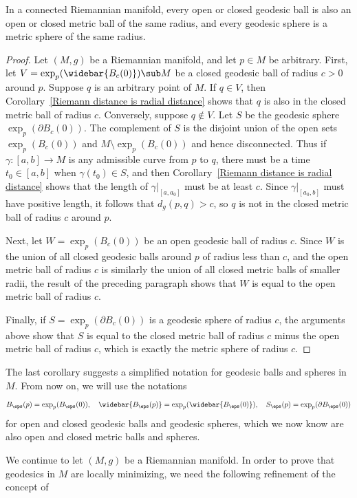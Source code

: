 \begin{corollary}\label{Riemann geodesic ball is metric ball}
In a connected Riemannian manifold, every open or closed geodesic ball is also an open or closed metric ball of the same radius, and every geodesic sphere is a metric sphere of the same radius.
\end{corollary}
\begin{proof}
Let $(M,g)$ be a Riemannian manifold, and let $p\in M$ be arbitrary. First, let $V=\exp_p(\widebar{B_c(0)})\sub M$ be a closed geodesic ball of radius $c>0$ around $p$. Suppose $q$ is an arbitrary point of $M$. If $q\in V$, then Corollary~\ref{Riemann distance is radial distance} shows that $q$ is also in the closed metric ball of radius $c$. Conversely, suppose $q\notin V$. Let $S$ be the geodesic sphere $\exp_p(\partial B_{c}(0))$. The complement of $S$ is the disjoint union of the open sets $\exp_p(B_{c}(0))$ and $M\setminus\exp_p(B_{c}(0))$ and hence disconnected. Thus if $\gamma:[a,b]\to M$ is any admissible curve from $p$ to $q$, there must be a time $t_0\in[a,b]$ when $\gamma(t_0)\in S$, and then Corollary~\ref{Riemann distance is radial distance} shows that the length of $\gamma|_{[a,a_0]}$ must be at least $c$. Since $\gamma|_{[a_0,b]}$ must have positive length, it follows that $d_g(p,q)>c$, so $q$ is not in the closed metric ball of radius $c$ around $p$.\par
Next, let $W=\exp_p(B_c(0))$ be an open geodesic ball of radius $c$. Since $W$ is the union of all closed geodesic balls around $p$ of radius less than $c$, and the open metric ball of radius $c$ is similarly the union of all closed metric balls of smaller radii, the result of the preceding paragraph shows that $W$ is equal 
to the open metric ball of radius $c$.\par
Finally, if $S=\exp_p(\partial B_c(0))$ is a geodesic sphere of radius $c$, the arguments above show that $S$ is equal to the closed metric ball of radius $c$ minus the open metric ball of radius $c$, which is exactly the metric sphere of radius $c$.
\end{proof}
The last corollary suggests a simplified notation for geodesic balls and spheres in $M$. From now on, we will use the notations
\[B_{\eps}(p)=\exp_p(B_{\eps}(0)),\quad\widebar{B_{\eps}(p)}=\exp_p(\widebar{B_{\eps}(0)}),\quad S_{\eps}(p)=\exp_p(\partial B_{\eps}(0))\]
for open and closed geodesic balls and geodesic spheres, which we now know are also open and closed metric balls and spheres.\par
We continue to let $(M,g)$ be a Riemannian manifold. In order to prove that geodesics in $M$ are locally minimizing, we need the following refinement of the concept of 
